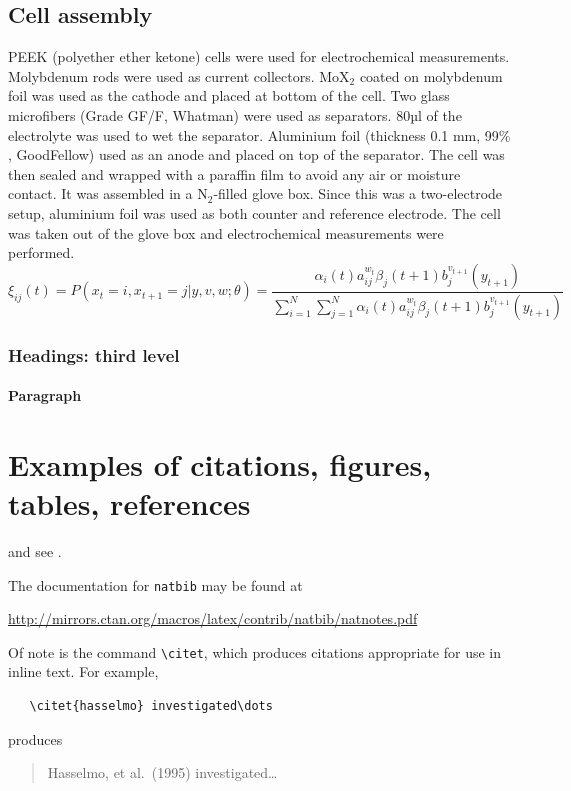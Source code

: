 \documentclass{article}
\begin{document}
\subsection{Cell assembly}
PEEK (polyether ether ketone) cells were used for electrochemical measurements. Molybdenum rods were used as current collectors. MoX$_2$ coated on molybdenum foil was used as the cathode and placed at bottom of the cell. Two glass microfibers (Grade GF/F, Whatman) were used as separators. 80µl of the electrolyte was used to wet the separator. Aluminium foil (thickness 0.1 mm, 99$\%$, GoodFellow) used as an anode and placed on top of the separator. The cell was then sealed and wrapped with a paraffin film to avoid any air or moisture contact. It was assembled in a N$_2$-filled glove box. Since this was a two-electrode setup, aluminium foil was used as both counter and reference electrode. The cell was taken out of the glove box and electrochemical measurements were performed. 
\lipsum[5]
\begin{equation}
\xi _{ij}(t)=P(x_{t}=i,x_{t+1}=j|y,v,w;\theta)= {\frac {\alpha _{i}(t)a^{w_t}_{ij}\beta _{j}(t+1)b^{v_{t+1}}_{j}(y_{t+1})}{\sum _{i=1}^{N} \sum _{j=1}^{N} \alpha _{i}(t)a^{w_t}_{ij}\beta _{j}(t+1)b^{v_{t+1}}_{j}(y_{t+1})}}
\end{equation}

\subsubsection{Headings: third level}
\lipsum[6]

\paragraph{Paragraph}
\lipsum[7]

\section{Examples of citations, figures, tables, references}
\label{sec:others}
\lipsum[8] \cite{kour2014real,kour2014fast} and see \cite{hadash2018estimate}.

The documentation for \verb+natbib+ may be found at
\begin{center}
  \url{http://mirrors.ctan.org/macros/latex/contrib/natbib/natnotes.pdf}
\end{center}
Of note is the command \verb+\citet+, which produces citations
appropriate for use in inline text.  For example,
\begin{verbatim}
   \citet{hasselmo} investigated\dots
\end{verbatim}
produces
\begin{quote}
  Hasselmo, et al.\ (1995) investigated\dots
\end{quote}
\end{document}
